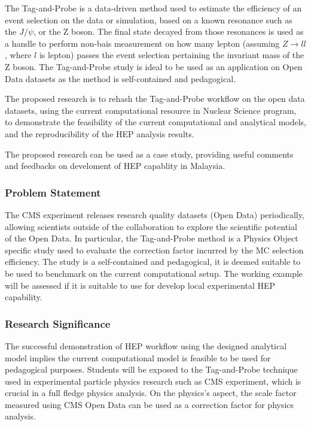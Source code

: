 \documentclass[]{article}
\begin{document}
The Tag-and-Probe is a data-driven method used to estimate the efficiency of an event selection on the data or simulation, based on a known resonance such as the $J/\psi$, or the Z boson. The final state decayed from those resonances is used as a handle to perform non-bais measurement on how many lepton (assuming $Z \rightarrow l l$, where $l$ is lepton) passes the event selection pertaining the invariant mass of the Z boson. The Tag-and-Probe study is ideal to be used as an application on Open Data datasets as the method is self-contained and pedagogical.

The proposed research is to rehash the Tag-and-Probe workflow on the open data datasets, using the current computational resource in Nuclear Science program, to demonstrate the feasibility of the current computational and analytical models, and the reproducibility of the HEP analysis results.

The proposed research can be used as a case study, providing useful comments and feedbacks on develoment of HEP capablity in Malaysia.

\subsubsection{Problem Statement}

The CMS experiment releases research quality datasets (Open Data) periodically, allowing scientists outside of the collaboration to explore the scientific potential of the Open Data. In particular, the Tag-and-Probe method is a Physics Object specific study used to evaluate the correction factor incurred by the MC selection efficiency. The study is a self-contained and pedagogical, it is deemed suitable to be used to benchmark on the current computational setup. The working example will be assessed if it is suitable to use for develop local experimental HEP capability.

\subsubsection{Research Significance}

The successful demonstration of HEP workflow using the designed analytical model implies the current computational model is feasible to be used for pedagogical purposes. Students will be exposed to the Tag-and-Probe technique used in experimental particle physics research such as CMS experiment, which is crucial in a full fledge physics analysis. On the physics's aspect, the scale factor measured using CMS Open Data can be used as a correction factor for physics analysis.
\end{document}
